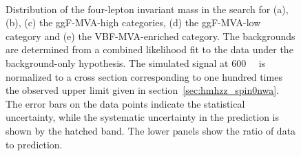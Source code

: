 \begin{figure}[!ht]
  \begin{center}
   \\
  
    \caption{Distribution of the four-lepton invariant mass \mfl in the \llll search 
        for (a), (b), (c) the ggF-MVA-high categories, (d) the ggF-MVA-low category 
        and (e) the VBF-MVA-enriched category. 
    The backgrounds are determined from a combined likelihood fit to the data under the background-only 
    hypothesis. The simulated signal at 600~\gev~ is normalized to 
    a cross section corresponding to one hundred times the observed upper limit given in section~\ref{sec:hmhzz_spin0nwa}. 
    The error bars on the data points indicate the statistical uncertainty, 
    while the systematic uncertainty in the prediction is shown by the hatched band. 
    The lower panels show the ratio of data to prediction.}   
  \label{fig:m4l_postfit} 
  \end{center}
\end{figure}


